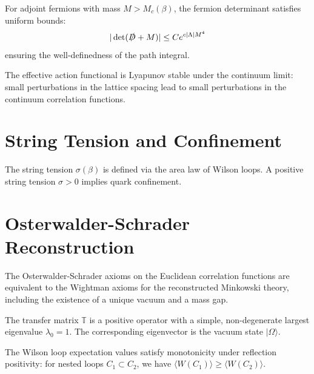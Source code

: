 \begin{theorem}
For adjoint fermions with mass $M > M_c(\beta)$, the fermion determinant satisfies uniform bounds:
\begin{equation}
|\det(\slashed{D} + M)| \le C e^{c|\Lambda| M^4}
\end{equation}
ensuring the well-definedness of the path integral.
\end{theorem}

\begin{theorem}
\label{thm:continuum-lyapunov}
The effective action functional is Lyapunov stable under the continuum limit: small perturbations in the lattice spacing lead to small perturbations in the continuum correlation functions.
\end{theorem}

\section{String Tension and Confinement}
\label{sec:string}

\begin{definition}
The string tension $\sigma(\beta)$ is defined via the area law of Wilson loops. A positive string tension $\sigma > 0$ implies quark confinement.
\end{definition}

\section{Osterwalder-Schrader Reconstruction}
\label{sec:osterwalder}

\begin{theorem}[OS Reconstruction]
The Osterwalder-Schrader axioms on the Euclidean correlation functions are equivalent to the Wightman axioms for the reconstructed Minkowski theory, including the existence of a unique vacuum and a mass gap.
\end{theorem}

\begin{theorem}
\label{thm:perron-frobenius}
The transfer matrix $\mathbb{T}$ is a positive operator with a simple, non-degenerate largest eigenvalue $\lambda_0 = 1$. The corresponding eigenvector is the vacuum state $|\Omega\rangle$.
\end{theorem}

\begin{theorem}[RP Monotonicity]
\label{thm:rp-monotonicity}
The Wilson loop expectation values satisfy monotonicity under reflection positivity: for nested loops $C_1 \subset C_2$, we have $\langle W(C_1) \rangle \ge \langle W(C_2) \rangle$.
\end{theorem}

